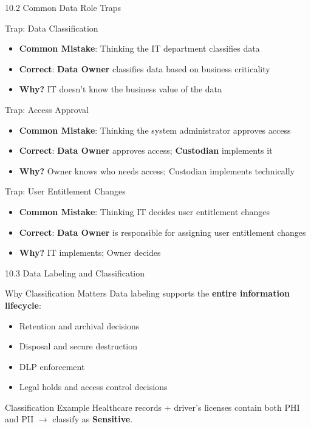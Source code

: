 \documentclass{beamer}
\begin{document}
	\begin{frame}{10.2 Common Data Role Traps}
		\begin{block}{Trap: Data Classification}
			\begin{itemize}
				\item \textbf{Common Mistake}: Thinking the IT department classifies data
				\item \textbf{Correct}: \textbf{Data Owner} classifies data based on business criticality
				\item \textbf{Why?} IT doesn't know the business value of the data
			\end{itemize}
		\end{block}
		
		\begin{block}{Trap: Access Approval}
			\begin{itemize}
				\item \textbf{Common Mistake}: Thinking the system administrator approves access
				\item \textbf{Correct}: \textbf{Data Owner} approves access; \textbf{Custodian} implements it
				\item \textbf{Why?} Owner knows who needs access; Custodian implements technically
			\end{itemize}
		\end{block}
		
		\begin{block}{Trap: User Entitlement Changes}
			\begin{itemize}
				\item \textbf{Common Mistake}: Thinking IT decides user entitlement changes
				\item \textbf{Correct}: \textbf{Data Owner} is responsible for assigning user entitlement changes
				\item \textbf{Why?} IT implements; Owner decides
			\end{itemize}
		\end{block}
	\end{frame}
	
	\begin{frame}{10.3 Data Labeling and Classification}
		\begin{block}{Why Classification Matters}
			Data labeling supports the \textbf{entire information lifecycle}:
			\begin{itemize}
				\item Retention and archival decisions
				\item Disposal and secure destruction
				\item DLP enforcement
				\item Legal holds and access control decisions
			\end{itemize}
		\end{block}
		
		\begin{exampleblock}{Classification Example}
			Healthcare records + driver's licenses contain both PHI and PII $\rightarrow$ classify as \textbf{Sensitive}.
		\end{exampleblock}
	\end{frame}
	
\end{document}
